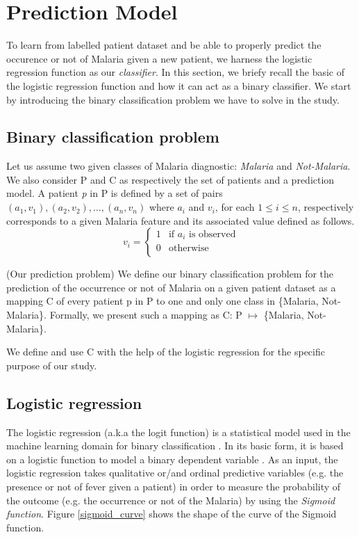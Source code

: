 \section{Prediction Model}\label{prediction_model}
To learn from labelled patient dataset and be able to properly predict 
the occurence or not of Malaria given a new patient, we harness the logistic 
regression function as our \emph{classifier}. 
In this section, we briefy recall the basic of the logistic regression function
and how it can act as a binary classifier. We start by introducing the binary 
classification problem we have to solve in the study.

\subsection{Binary classification problem}
Let us assume two given classes of Malaria diagnostic: \emph{Malaria} and \emph{Not-Malaria}.
We also consider \textsc{P} and \textsc{C} as respectively the set of patients and a prediction model.
A patient \emph{p} in \textsc{P} is defined by a set of pairs $(a_1, v_1), (a_2, v_2), \ldots, (a_n, v_n)$
where $a_i$ and $v_i$, for each $1\leq i\leq n$, respectively corresponds to a given Malaria feature and its associated value defined
as follows.
\begin{equation}
v_i = \left\{
\begin{array}{rl}
1 &\text{if $a_i$ is observed} \\
0 &\text{otherwise} \\
\end{array}
\right.
\end{equation}

\begin{definition}{(Our prediction problem)}
We define our binary classification problem for the prediction of the occurrence
or not of Malaria on a given patient dataset as a mapping \textsc{C} of every patient p in \textsc{P} 
to one and only one class in \{Malaria, Not-Malaria\}. Formally, we present such a mapping as \textsc{C}: \textsc{P} $\mapsto$ \{Malaria, Not-Malaria\}.
\end{definition}


We define and use  \textsc{C} with the help of the logistic regression for the specific purpose of our study. 
\subsection{Logistic regression}
The logistic regression (a.k.a the logit function) is a statistical model used in the machine learning domain for binary classification \cite{Ch14}.
In its basic form, it is based on a logistic function to model a binary dependent variable \cite{Ho00,Sa14}.
As an input, the logistic regression  takes qualitative or/and ordinal predictive variables (e.g. the presence
or not of fever given a patient) in order to measure the probability of the outcome (e.g. the occurrence or not of the Malaria) 
by using the \emph{Sigmoid function}. Figure \ref{sigmoid_curve} shows the shape of the curve of the Sigmoid function. 

